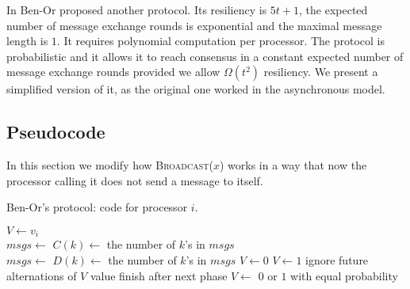 In \cite{Ben83} Ben-Or proposed another protocol. Its resiliency is $5t+1$, the expected number of message exchange rounds is exponential and the maximal message length is $1$. It requires polynomial computation per processor. The protocol is probabilistic and it allows it to reach consensus in a constant expected number of message exchange rounds provided we allow $\Omega(t^2)$ resiliency. We present a simplified version of it, as the original one worked in the asynchronous model.

\subsection{Pseudocode}
In this section we modify how \textsc{Broadcast($x$)} works in a way that now the processor calling it does not send a message to itself.
\begin{breakablealgorithm} \label{bo:code}
  \caption{Ben-Or's protocol: code for processor $i$.}
  \begin{algorithmic}[1]
    \State $V \gets v_i$
        \State {} \label{bo:code:er0_broadcast}
        \\
        \State $msgs \gets$  \label{bo:code:er1_receive}
            \State $C(k) \gets$ the number of $k$'s in $msgs$ \label{bo:code:er1_count}
        \EndFor
         \label{bo:code:er1_if1}
            \State {} \label{bo:code:er1_broadcast0}
         \label{bo:code:er1_if2}
            \State {} \label{bo:code:er1_broadcast1}
        \EndIf
        \\ 
        \State $msgs \gets$  \label{bo:code:er2_receive}
            \State $D(k) \gets$ the number of $k$'s in $msgs$ \label{bo:code:er2_count}
        \EndFor
                \State $V \gets 0$ \label{bo:code:er2_vgets0}
            \EndIf
                \State $V \gets 1$ \label{bo:code:er2_vgets1}
            \EndIf
                \State ignore future alternations of $V$ value \label{bo:code:er2_ignore}
                \State finish after next phase \label{bo:code:er2_finish}
            \EndIf
        \Else
            \State $V \gets $ $0$ or $1$ with equal probability \label{bo:code:er2_random}
        \EndIf
    \EndWhile
  \end{algorithmic}
\end{breakablealgorithm}

